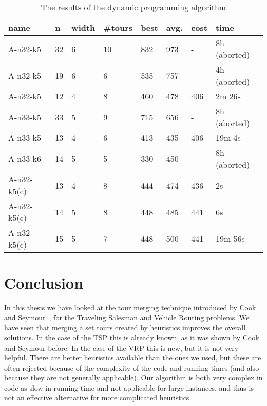 \documentclass[12pt]{article}
\begin{document}
    \begin{table}
    \begin{tabular}{l l l l l l l l}
        name        & n     & width & \#tours   & best  & avg. & cost   & time \\ \hline
        A-n32-k5    & 32    & 6     & 10        & 832   & 973  & -      & 8h (aborted) \\
        A-n32-k5    & 19    & 6     & 6         & 535   & 757  & -      & 4h (aborted) \\
        A-n32-k5    & 12    & 4     & 8         & 460   & 478  & 406    & 2m 26s \\
        A-n33-k5    & 33    & 5     & 9         & 715   & 656  & -      & 8h (aborted) \\
        A-n33-k5    & 13    & 4     & 6         & 413   & 435  & 406    & 19m 4s \\
        A-n33-k6    & 14    & 5     & 5         & 330   & 450  & -      & 8h (aborted) \\
        A-n32-k5(c) & 13    & 4     & 8         & 444   & 474  & 436    & 2s \\
        A-n32-k5(c) & 14    & 5     & 8         & 448   & 485  & 441    & 6s \\
        A-n32-k5(c) & 15    & 5     & 7         & 448   & 500  & 441    & 19m 56s \\
    \end{tabular}
    \caption{The results of the dynamic programming algorithm}
    \label{table:vrp-dp}
    \end{table}



%
%
\section{Conclusion}
\label{sec:conclusion}
In this thesis we have looked at the tour merging technique introduced by Cook and
Seymour~\cite{cook-seymour}, for the Traveling Salesman and Vehicle Routing problems.
We have seen that merging a set tours created by heuristics improves the overall solutions. In the
case of the TSP this is already known, as it was shown by Cook and Seymour before. In the case of the
VRP this is new, but it is not very helpful. There are better heuristics available than the ones we
used, but these are often rejected because of the complexity of the code and running times (and also
because they are not generally applicable). Our algorithm is both very complex in code as slow in
running time and not applicable for large instances, and thus is not an effective alternative for
more complicated heuristics.
\end{document}
